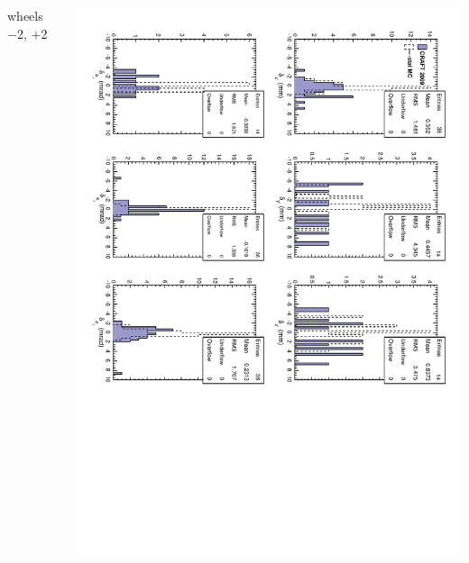 \documentclass[compress]{beamer}
\begin{document}
\begin{frame}
\begin{columns}
\begin{center}
wheels $-$2, $+$2
\end{center}
\includegraphics[height=\linewidth, angle=90]{tecdiff_outer.pdf}
\end{columns}
\end{frame}
\end{document}
